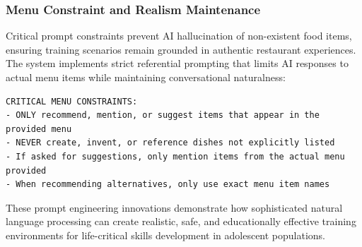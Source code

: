 \documentclass[MScCS]{uccthesis}
\begin{document}
\subsubsection{Menu Constraint and Realism Maintenance}

Critical prompt constraints prevent AI hallucination of non-existent food items, ensuring training scenarios remain grounded in authentic restaurant experiences. The system implements strict referential prompting that limits AI responses to actual menu items while maintaining conversational naturalness:

\begin{verbatim}
CRITICAL MENU CONSTRAINTS:
- ONLY recommend, mention, or suggest items that appear in the provided menu
- NEVER create, invent, or reference dishes not explicitly listed
- If asked for suggestions, only mention items from the actual menu provided
- When recommending alternatives, only use exact menu item names
\end{verbatim}

These prompt engineering innovations demonstrate how sophisticated natural language processing can create realistic, safe, and educationally effective training environments for life-critical skills development in adolescent populations.
\end{document}
